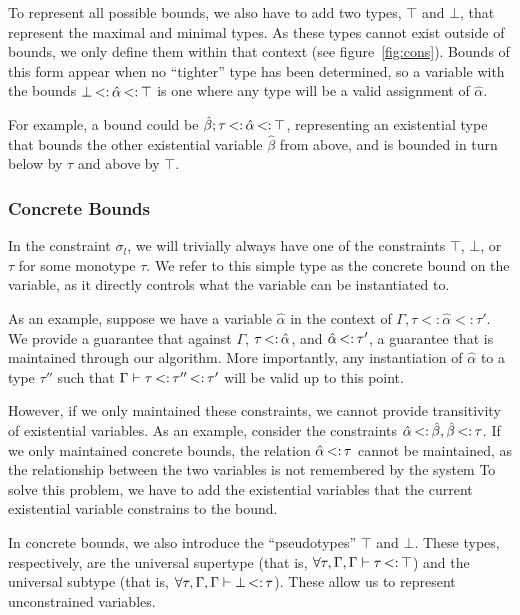 \documentclass{sig-alternate}
\newcommand{\st}{\ensuremath{\hspace{-1px}<:\hspace{-1px}}}
\newcommand{\alphahat}{\hat{\alpha}}
\newcommand{\betahat}{\hat{\beta}}
\newcommand{\botbound}{\sigma_{l}}
\newcommand{\ctxbsep}{;}
\newcommand{\tst}{{\scriptstyle{<:}}}
\newcommand{\bound}[3]{#1 \tst #2 \tst #3}
\begin{document}
To represent all possible bounds, we also have to add two types, $\top$ and $\bot$, that represent the maximal and minimal types. As these types cannot exist outside of bounds, we only define them within that context (see figure~\ref{fig:cons}). Bounds of this form appear when no ``tighter'' type has been determined, so a variable with the bounds $\bot\st\alphahat\st\top$ is one where any type will be a valid assignment of $\alphahat$.

For example, a bound could be $\betahat\ctxbsep\tau\st\alphahat\st\top$, representing an existential type that bounds the other existential variable $\betahat$ from above, and is bounded in turn below by $\tau$ and above by $\top$. 


\subsubsection{Concrete Bounds}
In the constraint $\botbound$, we will trivially always have one of the constraints $\top$, $\bot$, or $\tau$ for some monotype $\tau$. We refer to this simple type as the concrete bound on the variable, as it directly controls what the variable can be instantiated to.

As an example, suppose we have a variable $\hat{\alpha}$ in the context of $\Gamma, \bound{\tau}{\hat{\alpha}}{\tau'}$. We provide a guarantee that against $\Gamma$, $\tau \st \hat{\alpha}$, and $\hat{\alpha} \st \tau'$, a guarantee that is maintained through our algorithm. More importantly, any instantiation of $\alphahat$ to a type $\tau''$ such that $\Gamma \vdash \tau \st \tau'' \st \tau'$ will be valid up to this point.

However, if we only maintained these constraints, we cannot provide transitivity of existential variables. As an example, consider the constraints $\hat{\alpha} \st \hat{\beta}, \hat{\beta} \st \tau$. If we only maintained concrete bounds, the relation $\hat{\alpha} \st \tau$ cannot be maintained, as the relationship between the two variables is not remembered by the system To solve this problem, we have to add the existential variables that the current existential variable constrains to the bound.

In concrete bounds, we also introduce the ``pseudotypes'' $\top$ and $\bot$. These types, respectively, are the universal supertype (that is, $\forall\tau,\Gamma, \Gamma \vdash \tau \st \top$) and the universal subtype (that is, $\forall\tau,\Gamma, \Gamma \vdash \bot \st \tau$). These allow us to represent unconstrained variables.
\end{document}
